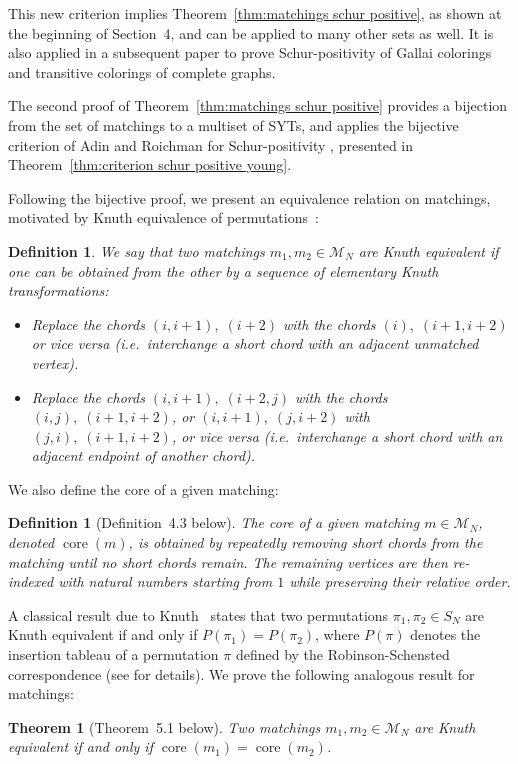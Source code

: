 \documentclass[11pt]{article}
\newtheorem{definition}[theo]{Definition}
\newtheorem{theorem}[theo]{Theorem}
\theoremstyle{definition}
\providecommand{\ie}{i.e.\ }
\numberwithin{equation}{section}
\newcommand{\core}{\operatorname{core}}
\newcommand{\M}{\mathcal{M}}
\begin{document}
This new criterion implies Theorem~\ref{thm:matchings schur positive}, %
as shown at the beginning of Section~4, and can be applied to many other sets as well.
It is also applied in a subsequent paper \cite{gallai} to prove Schur-positivity of Gallai colorings and transitive colorings of complete graphs.

The second proof of Theorem~\ref{thm:matchings schur positive} provides a bijection from the set of matchings to a multiset of SYTs,
and applies the bijective criterion of Adin and Roichman for Schur-positivity \cite[Prop.\ 9.1]{adin_roichman_fine_set}, presented in Theorem~\ref{thm:criterion schur positive young}.

Following the bijective proof, we present an equivalence relation on matchings, motivated by Knuth equivalence of permutations~\cite{knuth1970permutations}:
\begin{definition}\label{def:knuth like equivalence}
    We say that two matchings $m_1,m_2 \in \M_N$ are \emph{Knuth equivalent} if one can be obtained from the other by a sequence of \emph{elementary Knuth transformations}:
    \begin{itemize}
        \item Replace the chords $(i,i+1),\; (i+2)$ with the chords $(i),\; (i+1,i+2)$ or vice versa (\ie interchange a short chord with an adjacent unmatched vertex).
        \item Replace the chords $(i,i+1),\; (i+2,j)$ with the chords $(i,j),\; (i+1,i+2)$, or $(i,i+1),\; (j,i+2)$ with $(j,i),\; (i+1,i+2)$, or vice versa (\ie interchange a short chord with an adjacent endpoint of another chord).
    \end{itemize}
\end{definition}

We also define the core of a given matching:

\begin{definition}[Definition~4.3 below]
    The \emph{core} of a given matching $m \in \M_N$, denoted $\core(m)$, is obtained by repeatedly removing short chords from the matching until no short chords remain. The remaining vertices are then re-indexed with natural numbers starting from $1$ while preserving their relative order.

\end{definition}

A classical result due to Knuth~\cite{knuth1970permutations} states that two permutations $\pi_1,\pi_2 \in S_N$ are Knuth equivalent if and only if $P(\pi_1) = P(\pi_2)$, where $P(\pi)$ denotes the insertion tableau of a permutation $\pi$ defined by the Robinson-Schensted correspondence (see \cite[Section 3]{sagan_book} for details). We prove the following analogous result for matchings:
\begin{theorem}[Theorem~5.1 below]
    Two matchings $m_1, m_2 \in \M_N$ are Knuth equivalent if and only if $\core(m_1) = \core(m_2)$.
\end{theorem}
\end{document}
